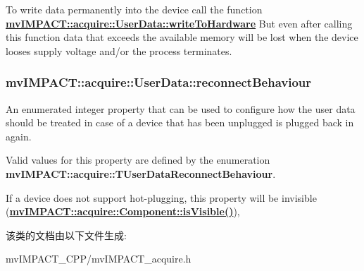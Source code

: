 To write data permanently into the device call the function {\bfseries \hyperlink{classmv_i_m_p_a_c_t_1_1acquire_1_1_user_data_ae6e2e87a923281c6a821b0f221b968b8}{mv\+I\+M\+P\+A\+C\+T\+::acquire\+::\+User\+Data\+::write\+To\+Hardware}} But even after calling this function data that exceeds the available memory will be lost when the device looses supply voltage and/or the process terminates. \hypertarget{classmv_i_m_p_a_c_t_1_1acquire_1_1_user_data_a14b5d5322cb10f3d6ce9b67e613a4cb4}{
\subsubsection[{reconnect\+Behaviour}]{ mv\+I\+M\+P\+A\+C\+T\+::acquire\+::\+User\+Data\+::reconnect\+Behaviour}}\label{classmv_i_m_p_a_c_t_1_1acquire_1_1_user_data_a14b5d5322cb10f3d6ce9b67e613a4cb4}


An enumerated integer property that can be used to configure how the user data should be treated in case of a device that has been unplugged is plugged back in again. 

Valid values for this property are defined by the enumeration {\bfseries mv\+I\+M\+P\+A\+C\+T\+::acquire\+::\+T\+User\+Data\+Reconnect\+Behaviour}.

If a device does not support hot-\/plugging, this property will be invisible ({\bfseries \hyperlink{classmv_i_m_p_a_c_t_1_1acquire_1_1_component_ae9f95ac45440af06f7d36990ad633a73}{mv\+I\+M\+P\+A\+C\+T\+::acquire\+::\+Component\+::is\+Visible()}}), 

该类的文档由以下文件生成\+:\begin{DoxyCompactItemize}
\item 
mv\+I\+M\+P\+A\+C\+T\+\_\+\+C\+P\+P/mv\+I\+M\+P\+A\+C\+T\+\_\+acquire.\+h\end{DoxyCompactItemize}
